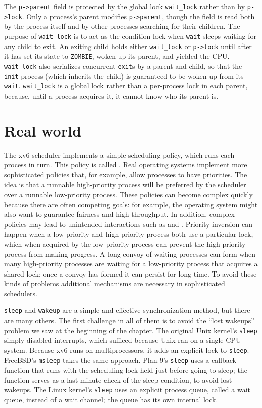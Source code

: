The \lstinline{p->parent} field is protected by the global lock
\lstinline{wait_lock} rather than by \lstinline{p->lock}.
Only a process's parent modifies \lstinline{p->parent}, though
the field is read both by the process itself and by other
processes searching for their children. The purpose of 
\lstinline{wait_lock} is to act as the condition lock when
\lstinline{wait} sleeps waiting for any child to exit. An
exiting child holds either \lstinline{wait_lock} or \lstinline{p->lock}
until after it has set its state to \lstinline{ZOMBIE}, woken
up its parent, and yielded the CPU. \lstinline{wait_lock} also
serializes concurrent \lstinline{exit}s by a parent and child,
so that the \lstinline{init} process (which inherits the child)
is guaranteed to be woken up from its \lstinline{wait}.
\lstinline{wait_lock} is a global lock rather than a per-process
lock in each parent, because, until a process acquires it,
it cannot know who its parent is.

\section{Real world}

The xv6 scheduler implements a simple scheduling policy, which runs each process
in turn.  This policy is called
.
Real operating systems implement more sophisticated policies that, for example,
allow processes to have priorities.  The idea is that a runnable high-priority process
will be preferred by the scheduler over a runnable low-priority process.   These
policies can become complex quickly because there are often competing goals: for
example, the operating system might also want to guarantee fairness and
high throughput.  In addition, complex policies may lead to unintended
interactions such as
and 
.
Priority inversion can happen when a low-priority and high-priority process
both use a particular lock, which when acquired by the low-priority process can prevent the
high-priority process from making progress.  A long convoy of waiting processes
can form when many
high-priority processes are waiting for a low-priority process that acquires a
shared lock; once a convoy has formed it can persist for long time.
To avoid these kinds of problems additional mechanisms are necessary in
sophisticated schedulers.

\lstinline{sleep}
and
\lstinline{wakeup}
are a simple and effective synchronization method,
but there are many others.
The first challenge in all of them is to
avoid the ``lost wakeups'' problem we saw at the
beginning of the chapter.
The original Unix kernel's
\lstinline{sleep}
simply disabled interrupts,
which sufficed because Unix ran on a single-CPU system.
Because xv6 runs on multiprocessors,
it adds an explicit lock to
\lstinline{sleep}.
FreeBSD's
\lstinline{msleep}
takes the same approach.
Plan 9's 
\lstinline{sleep}
uses a callback function that runs with the scheduling
lock held just before going to sleep;
the function serves as a last-minute check
of the sleep condition, to avoid lost wakeups.
The Linux kernel's
\lstinline{sleep}
uses an explicit process queue, called a wait queue, instead of
a wait channel; the queue has its own internal lock.

